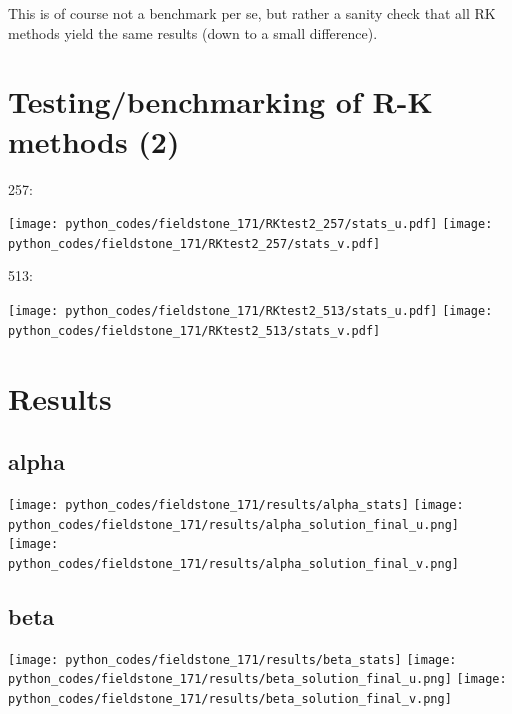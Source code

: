 This is of course not a benchmark per se, but rather a sanity check that 
all RK methods yield the same results (down to a small difference).

\newpage
\section*{Testing/benchmarking of R-K methods (2)}

257:
\begin{center}
\texttt{[image: python\_codes/fieldstone\_171/RKtest2\_257/stats\_u.pdf]}
\texttt{[image: python\_codes/fieldstone\_171/RKtest2\_257/stats\_v.pdf]}
\end{center}

513:

\begin{center}
\texttt{[image: python\_codes/fieldstone\_171/RKtest2\_513/stats\_u.pdf]}
\texttt{[image: python\_codes/fieldstone\_171/RKtest2\_513/stats\_v.pdf]}
\end{center}





\newpage
\section*{Results}

\subsection*{alpha}

\begin{center}
\texttt{[image: python\_codes/fieldstone\_171/results/alpha\_stats]}
\texttt{[image: python\_codes/fieldstone\_171/results/alpha\_solution\_final\_u.png]}
\texttt{[image: python\_codes/fieldstone\_171/results/alpha\_solution\_final\_v.png]}
\end{center}

\subsection*{beta}

\begin{center}
\texttt{[image: python\_codes/fieldstone\_171/results/beta\_stats]}
\texttt{[image: python\_codes/fieldstone\_171/results/beta\_solution\_final\_u.png]}
\texttt{[image: python\_codes/fieldstone\_171/results/beta\_solution\_final\_v.png]}
\end{center}

